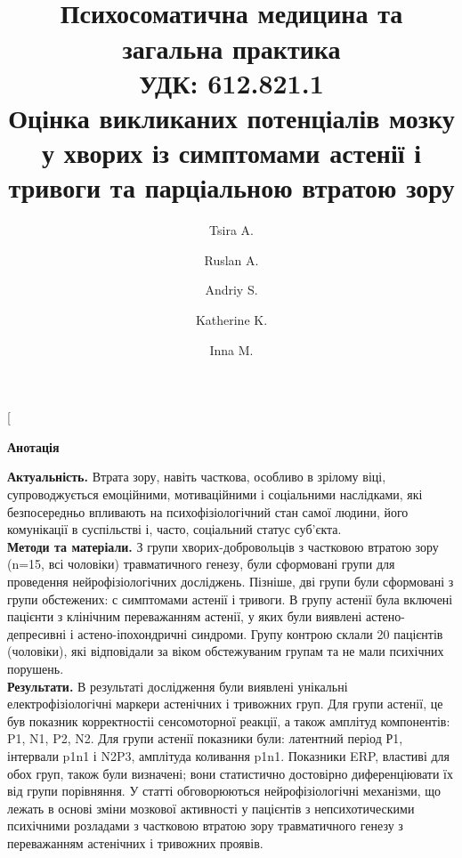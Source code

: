 \documentclass[twocolumn]{article}
\date{}
\begin{document}
\title{
\\[-1.5cm]
\bfseries \qquad Психосоматична медицина та загальна практика\\[0.5cm]{
\flushleft\small{УДК: 612.821.1\hfill }\\[0.4cm]}{
\LARGE \bfseries Оцінка викликаних потенціалів мозку у хворих із симптомами астенії і тривоги та парціальною втратою зору
}}
\author[1,2,3]{Tsira A.}
\author[2,3]{Ruslan A.}
\author[3]{Andriy S.}
\author[4]{Katherine K.}
\author[4]{Inna M.}
\twocolumn[
\begin{@twocolumnfalse}
\maketitle
\begin{center}
{\Large \textbf{Анотація}} \vspace{1ex}\\
\end{center}
\textbf{Актуальність. }Втрата зору, навіть часткова, особливо в зрілому віці, супроводжується емоційними, мотиваційними і соціальними наслідками, які безпосередньо впливають на психофізіологічний стан самої людини, його комунікації в суспільстві і, часто, соціальний статус суб'єкта. \vspace{1ex}\\
\textbf{Методи та матеріали. }З групи хворих-добровольців з частковою втратою зору (n=15, всі чоловіки) травматичного генезу, були сформовані групи для проведення нейрофізіологічних досліджень. Пізніше, дві групи були сформовані з групи обстежених: с симптомами астенії і тривоги. В групу астенії була включені пацієнти з клінічним переважанням астенії, у яких були виявлені астено-депресивні і астено-іпохондричні синдроми. Групу контрою склали 20 пацієнтів (чоловіки), які відповідали за віком обстежуваним групам та не мали психічних порушень. \vspace{1ex}\\
\textbf{Результати. }В результаті дослідження були виявлені унікальні електрофізіологічні маркери астенічних і тривожних груп. Для групи астенії, це був показник корректностіі сенсомоторної реакції, а також амплітуд компонентів: P1, N1, P2, N2. Для групи астенії показники були: латентний період Р1, інтервали p1n1 і N2P3, амплітуда коливання p1n1. Показники ERP, властиві для обох груп, також були визначені; вони статистично достовірно диференціювати їх від групи порівняння. У статті обговорюються нейрофізіологічні механізми, що лежать в основі зміни мозкової активності у пацієнтів з непсихотическими психічними розладами з частковою втратою зору травматичного генезу з переважанням астенічних і тривожних проявів. \vspace{1ex}\\

\end{@twocolumnfalse}
\end{document}
